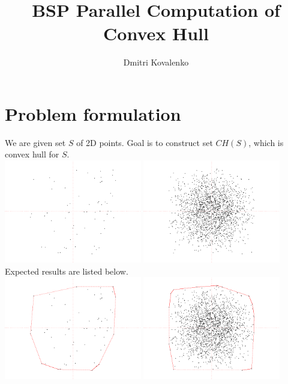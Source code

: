 \documentclass[a4paper]{article}
\begin{document}
\title {BSP Parallel Computation of Convex Hull}
\author {Dmitri Kovalenko}

\maketitle



\section {Problem formulation}
    We are given set $S$ of 2D points. Goal is to construct set $CH(S)$, which is convex hull for $S$.\\
    \includegraphics [width=0.45\textwidth] {plain_points.png}
    \includegraphics [width=0.45\textwidth] {plain_points_b.png}\\
    Expected results are listed below.\\
    \includegraphics [width=0.45\textwidth] {final_hull.png}
    \includegraphics [width=0.45\textwidth] {final_hull_b.png}\\
\end{document}

